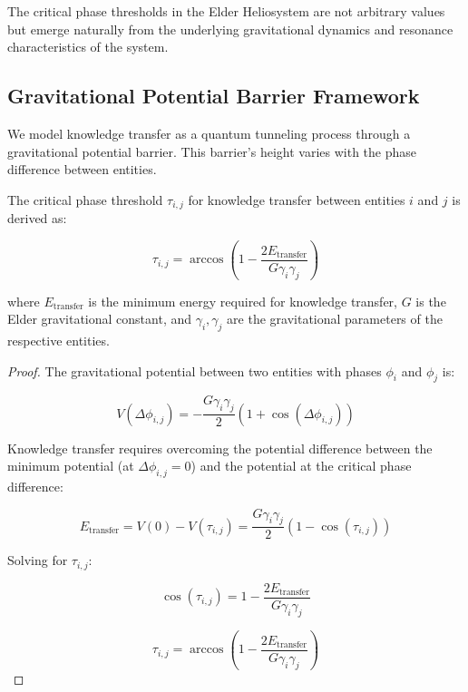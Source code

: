 The critical phase thresholds in the Elder Heliosystem are not arbitrary values but emerge naturally from the underlying gravitational dynamics and resonance characteristics of the system.

\subsection{Gravitational Potential Barrier Framework}

We model knowledge transfer as a quantum tunneling process through a gravitational potential barrier. This barrier's height varies with the phase difference between entities.

\begin{theorem}
The critical phase threshold $\tau_{i,j}$ for knowledge transfer between entities $i$ and $j$ is derived as:

\begin{equation}
\tau_{i,j} = \arccos\left(1 - \frac{2E_{\text{transfer}}}{G\gamma_i\gamma_j}\right)
\end{equation}

where $E_{\text{transfer}}$ is the minimum energy required for knowledge transfer, $G$ is the Elder gravitational constant, and $\gamma_i, \gamma_j$ are the gravitational parameters of the respective entities.
\end{theorem}

\begin{proof}
The gravitational potential between two entities with phases $\phi_i$ and $\phi_j$ is:

\begin{equation}
V(\Delta\phi_{i,j}) = -\frac{G\gamma_i\gamma_j}{2}(1 + \cos(\Delta\phi_{i,j}))
\end{equation}

Knowledge transfer requires overcoming the potential difference between the minimum potential (at $\Delta\phi_{i,j}=0$) and the potential at the critical phase difference:

\begin{equation}
E_{\text{transfer}} = V(0) - V(\tau_{i,j}) = \frac{G\gamma_i\gamma_j}{2}(1 - \cos(\tau_{i,j}))
\end{equation}

Solving for $\tau_{i,j}$:

\begin{equation}
\cos(\tau_{i,j}) = 1 - \frac{2E_{\text{transfer}}}{G\gamma_i\gamma_j}
\end{equation}

\begin{equation}
\tau_{i,j} = \arccos\left(1 - \frac{2E_{\text{transfer}}}{G\gamma_i\gamma_j}\right)
\end{equation}
\end{proof}


